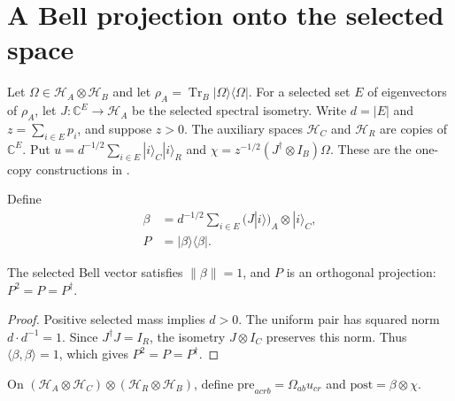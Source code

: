 \section{A Bell projection onto the selected space}
\label{sec:typical_bell_pin}

Let $\Omega\in\mathcal H_A\otimes\mathcal H_B$ and let
$\rho_A=\operatorname{Tr}_B|\Omega\rangle\langle\Omega|$.
For a selected set $E$ of eigenvectors of $\rho_A$, let
$J:\mathbb C^E\to\mathcal H_A$ be the selected spectral isometry.
Write $d=|E|$ and $z=\sum_{i\in E}p_i$, and suppose $z>0$.
The auxiliary spaces $\mathcal H_C$ and $\mathcal H_R$ are copies of
$\mathbb C^E$. Put
$u=d^{-1/2}\sum_{i\in E}|i\rangle_C|i\rangle_R$ and
$\chi=z^{-1/2}(J^\dagger\otimes I_B)\Omega$.
These are the one-copy constructions in
\cite[Section~7]{OpenAI2026AreaLaw}.

\begin{definition}
\label{def:typical_bell_projection}
\leanok
{}
Define
\begin{align}
 \beta&=d^{-1/2}\sum_{i\in E}(J|i\rangle)_A\otimes|i\rangle_C,
 \label{eq:bell_selected_vector}\\
 P&=|\beta\rangle\langle\beta|.
 \label{eq:bell_selected_projection}
\end{align}
\end{definition}

\begin{theorem}
\label{thm:typical_bell_projection}
\leanok
{}
The selected Bell vector satisfies $\|\beta\|=1$, and $P$ is an
orthogonal projection: $P^2=P=P^\dagger$.
\end{theorem}
\begin{proof}
\leanok
{}
Positive selected mass implies $d>0$.
The uniform pair has squared norm $d\cdot d^{-1}=1$.
Since $J^\dagger J=I_R$, the isometry $J\otimes I_C$ preserves this norm.
Thus $\langle\beta,\beta\rangle=1$, which gives $P^2=P=P^\dagger$.
\end{proof}

\begin{definition}
\label{def:typical_bell_vectors}
\leanok
{}
On $(\mathcal H_A\otimes\mathcal H_C)\otimes
(\mathcal H_R\otimes\mathcal H_B)$, define
$\mathrm{pre}_{acrb}=\Omega_{ab}u_{cr}$ and
$\mathrm{post}=\beta\otimes\chi$.
\end{definition}

